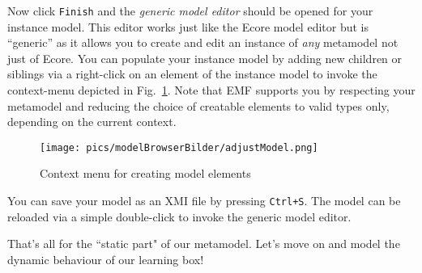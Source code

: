 Now click \texttt{Finish} and the \emph{generic model editor} should be opened for your instance model.
This editor works just like the Ecore model editor but is ``generic'' as it allows you to create and edit an instance of \emph{any} metamodel not just of Ecore.
You can populate your instance model by adding new children or siblings via a right-click on an element of the instance model to invoke the context-menu depicted in Fig.~\ref{fig:create_instance}.
Note that EMF supports you by respecting your metamodel and reducing the choice of creatable elements to valid types only, depending on the current context.

\begin{figure}[htbp]
	\centering
  \texttt{[image: pics/modelBrowserBilder/adjustModel.png]}
	\caption{Context menu for creating model elements}
	\label{fig:create_instance}
\end{figure}

You can save your model as an XMI file by pressing \texttt{Ctrl+S}.
The model can be reloaded via a simple double-click to invoke the generic model editor.

That's all for the ``static part" of our metamodel. Let's move on and model the dynamic behaviour of our learning box!